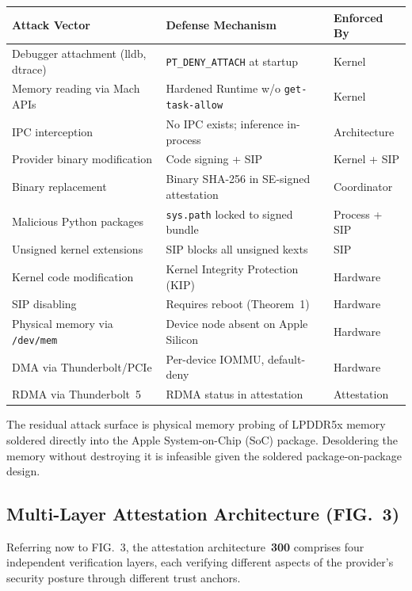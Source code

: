 \documentclass[11pt,letterpaper]{article}
\begin{document}
\begin{center}
\small
\begin{tabularx}{\textwidth}{lXl}
\toprule
\textbf{Attack Vector} & \textbf{Defense Mechanism} & \textbf{Enforced By} \\
\midrule
Debugger attachment (lldb, dtrace) & \texttt{PT\_DENY\_ATTACH} at startup & Kernel \\
Memory reading via Mach APIs & Hardened Runtime w/o \texttt{get-task-allow} & Kernel \\
IPC interception & No IPC exists; inference in-process & Architecture \\
Provider binary modification & Code signing + SIP & Kernel + SIP \\
Binary replacement & Binary SHA-256 in SE-signed attestation & Coordinator \\
Malicious Python packages & \texttt{sys.path} locked to signed bundle & Process + SIP \\
Unsigned kernel extensions & SIP blocks all unsigned kexts & SIP \\
Kernel code modification & Kernel Integrity Protection (KIP) & Hardware \\
SIP disabling & Requires reboot (Theorem~1) & Hardware \\
Physical memory via \texttt{/dev/mem} & Device node absent on Apple Silicon & Hardware \\
DMA via Thunderbolt/PCIe & Per-device IOMMU, default-deny & Hardware \\
RDMA via Thunderbolt~5 & RDMA status in attestation & Attestation \\
\bottomrule
\end{tabularx}
\end{center}

The residual attack surface is physical memory probing of LPDDR5x memory soldered directly into the Apple System-on-Chip (SoC) package. Desoldering the memory without destroying it is infeasible given the soldered package-on-package design.

\subsection{Multi-Layer Attestation Architecture (FIG.~3)}

Referring now to FIG.~3, the attestation architecture~\textbf{300} comprises four independent verification layers, each verifying different aspects of the provider's security posture through different trust anchors.
\end{document}
